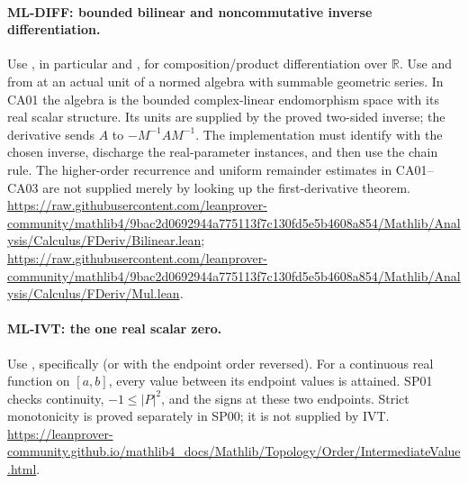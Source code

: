 \documentclass[11pt,a4paper]{article}
\theoremstyle{remark}\newtheorem{remark}[theorem]{Remark}
\newcommand{\R}{\mathbb R}\newcommand{\C}{\mathbb C}\newcommand{\N}{\mathbb N}
\begin{document}
\hypertarget{leaf:ML-DIFF}{}\paragraph{ML-DIFF: bounded bilinear and noncommutative inverse differentiation.}
Use , in particular  and , for composition/product differentiation over $\R$. Use  and  from  at an actual unit of a normed algebra with summable geometric series. In CA01 the algebra is the bounded complex-linear endomorphism space with its real scalar structure. Its units are supplied by the proved two-sided inverse; the derivative sends $A$ to $-M^{-1}AM^{-1}$. The implementation must identify  with the chosen inverse, discharge the real-parameter instances, and then use the chain rule. The higher-order recurrence and uniform remainder estimates in CA01--CA03 are not supplied merely by looking up the first-derivative theorem.
\url{https://raw.githubusercontent.com/leanprover-community/mathlib4/9bac2d0692944a775113f7c130fd5e5b4608a854/Mathlib/Analysis/Calculus/FDeriv/Bilinear.lean};
\url{https://raw.githubusercontent.com/leanprover-community/mathlib4/9bac2d0692944a775113f7c130fd5e5b4608a854/Mathlib/Analysis/Calculus/FDeriv/Mul.lean}.

\hypertarget{leaf:ML-IVT}{}\paragraph{ML-IVT: the one real scalar zero.}
Use , specifically
 (or  with the endpoint order reversed). For a continuous real function on $[a,b]$, every value between its endpoint values is attained. SP01 checks continuity, $-1\leq |P|^2$, and the signs at these two endpoints. Strict monotonicity is proved separately in SP00; it is not supplied by IVT.
\url{https://leanprover-community.github.io/mathlib4_docs/Mathlib/Topology/Order/IntermediateValue.html}.
\end{document}

